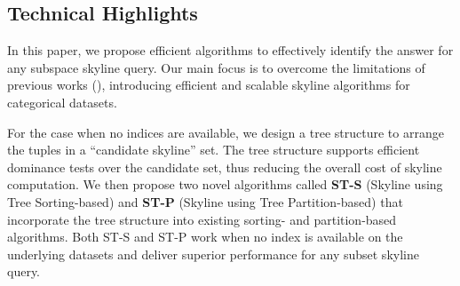 
\vspace{-2mm}
\subsection{Technical Highlights}
In this paper, we propose efficient algorithms to effectively identify the answer for any subspace skyline query. Our main focus is to overcome the limitations of previous works (\cite{morse2007efficient, preisinger2007hexagon}), introducing efficient and scalable skyline algorithms for categorical datasets. 


For the case when no indices are available, we design a tree structure to arrange the tuples in a ``candidate skyline'' set. 
The tree structure supports efficient dominance tests over the candidate set, thus reducing the overall cost of skyline computation. 
We then propose two novel algorithms called {\bf ST-S} (Skyline using Tree Sorting-based)  and {\bf ST-P} (Skyline using Tree Partition-based) 
that incorporate the tree structure into existing sorting- and partition-based algorithms. Both ST-S and ST-P work when no index is available on the underlying datasets and deliver superior performance for any subset skyline query.


